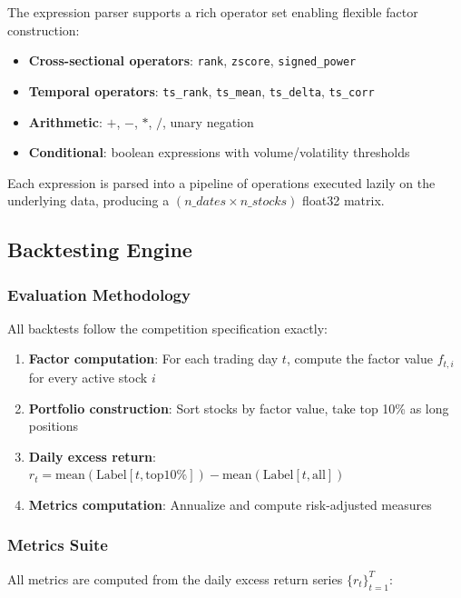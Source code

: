 \documentclass[11pt,a4paper]{ctexart}
\begin{document}
The expression parser supports a rich operator set enabling flexible factor construction:

\begin{itemize}[nosep]
    \item \textbf{Cross-sectional operators}: \texttt{rank}, \texttt{zscore}, \texttt{signed\_power}
    \item \textbf{Temporal operators}: \texttt{ts\_rank}, \texttt{ts\_mean}, \texttt{ts\_delta}, \texttt{ts\_corr}
    \item \textbf{Arithmetic}: $+$, $-$, $*$, $/$, unary negation
    \item \textbf{Conditional}: boolean expressions with volume/volatility thresholds
\end{itemize}

Each expression is parsed into a pipeline of operations executed lazily on the underlying data, producing a $(n\_dates \times n\_stocks)$ float32 matrix.

\subsection{Backtesting Engine}

\subsubsection{Evaluation Methodology}

All backtests follow the competition specification exactly:

\begin{enumerate}[nosep]
    \item \textbf{Factor computation}: For each trading day $t$, compute the factor value $f_{t,i}$ for every active stock $i$
    \item \textbf{Portfolio construction}: Sort stocks by factor value, take top 10\% as long positions
    \item \textbf{Daily excess return}: $r_t = \text{mean}(\text{Label}[t, \text{top10\%}]) - \text{mean}(\text{Label}[t, \text{all}])$
    \item \textbf{Metrics computation}: Annualize and compute risk-adjusted measures
\end{enumerate}

\subsubsection{Metrics Suite}

All metrics are computed from the daily excess return series $\{r_t\}_{t=1}^T$:
\end{document}
